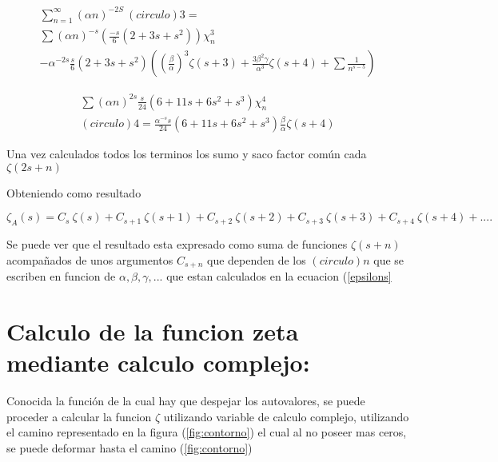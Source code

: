 \begin{equation}
\begin{array}{c}
    \sum _{n=1} ^{\infty}
    ( \alpha n ) ^{-2 S} \
    (circulo){3} = \\ 
    \sum (\alpha n) ^{-s} (\frac{-s}{6} (2 + 3s + s^2 ) ) \chi _n ^3 \\
    -\alpha ^{-2 s} \frac{s}{6} (2+3 s + s^2) \left(
    ( \frac{\beta}{\alpha} ) ^3 \zeta (s+3) + 
    \frac{3 \beta ^2 \gamma}{\alpha ^3} \zeta (s+4) +
    \sum \frac{1}{n ^{s-5}}
    \right)
\end{array}
\end{equation}

\begin{equation}
\begin{array}{cc}
    \sum (\alpha n) ^{2 s} \frac{s}{24} (6 + 11s+ 6s^2 + s^3) \chi _n ^4 \\
    (circulo){4} = \frac{\alpha ^{-s} s}{24} (6+11s+6 s ^2 + s^3) 
    \frac{\beta}{\alpha} \zeta (s+4)
\end{array}
\end{equation}

Una vez calculados todos los terminos los sumo y saco factor común cada $\zeta( 2s+n )$


Obteniendo como resultado 

\begin{equation}
    \zeta _A (s) = 
    C _s \ \zeta (s) +
    C _{s+1} \ \zeta (s+1) + 
    C _{s+2} \ \zeta (s+2) +
    C _{s+3} \ \zeta (s+3) + 
    C _{s+4} \ \zeta (s+4) + ....
\end{equation}

Se puede ver que el resultado esta expresado como suma de funciones $\zeta (s+n)$ acompañados de unos argumentos $C_{s+n}$ que dependen de los $(circulo){n}$ que se escriben en funcion de $\alpha,\beta,\gamma, ...$ que estan calculados en la ecuacion (\ref{epsilons}

\section{Calculo de la funcion zeta mediante calculo complejo:}

Conocida la función de la cual hay que despejar los autovalores, se puede proceder a calcular la funcion $\zeta$ utilizando variable de calculo complejo, utilizando el camino representado en la figura (\ref{fig:contorno}) el cual al no poseer mas ceros, se puede deformar hasta el camino (\ref{fig:contorno}) 

